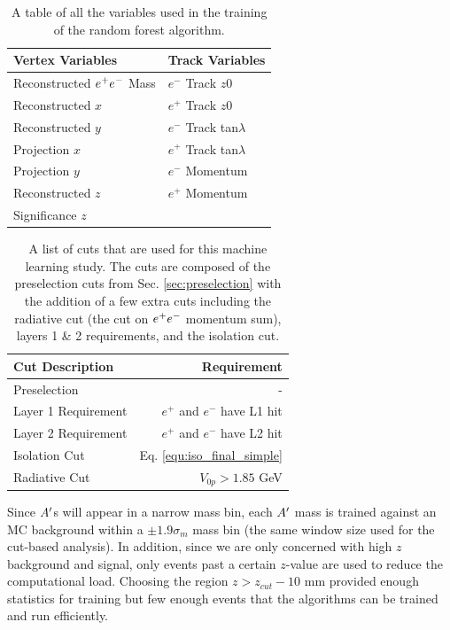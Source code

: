 \begin{table}[t]
\centering
\tabcolsep=0.09cm
\begin{tabular}{ll}

\hline

Vertex Variables & Track Variables\\
\hline
\hline
Reconstructed $e^{+}e^{-}$ Mass & $e^-$ Track $z0$ \\
Reconstructed $x$ & $e^+$ Track $z0$\\
Reconstructed $y$ & $e^-$ Track tan$\lambda$ \\
Projection $x$ & $e^+$ Track tan$\lambda$  \\
Projection $y$ & $e^-$ Momentum\\
Reconstructed $z$ & $e^+$ Momentum\\
Significance $z$ & \\

\hline

\hline
\end{tabular}
\caption{A table of all the variables used in the training of the random forest algorithm.}
\label{tab:ML}
\end{table}

\begin{table}[!hb] 
    \centering
    \begin{tabular}{lr}
        \toprule
        \textbf{Cut Description} & \textbf{Requirement} \\
        \midrule
        Preselection & - \\
        Layer 1 Requirement & $e^+$ and $e^-$ have L1 hit \\
        Layer 2 Requirement & $e^+$ and $e^-$ have L2 hit \\
        Isolation Cut & Eq. \ref{equ:iso_final_simple} \\
        Radiative Cut & $V_{0p} > 1.85$ GeV \\
        \bottomrule
    \end{tabular}
    \caption{A list of cuts that are used for this machine learning study. The cuts are composed of the preselection cuts from Sec. \ref{sec:preselection} with the addition of a few extra cuts including the radiative cut (the cut on $e^{+}e^{-}$ momentum sum), layers 1 \& 2 requirements, and the isolation cut.}
    \label{tab:ml_selection}
\end{table}

Since $A^\prime$s will appear in a narrow mass bin, each $A^\prime$ mass is trained against an MC background within a $\pm 1.9\sigma_m$ mass bin (the same window size used for the cut-based analysis). In addition, since we are only concerned with high $z$ background and signal, only events past a certain $z$-value are used to reduce the computational load. Choosing the region $z>z_{cut}-10$ mm provided enough statistics for training but few enough events that the algorithms can be trained and run efficiently.

